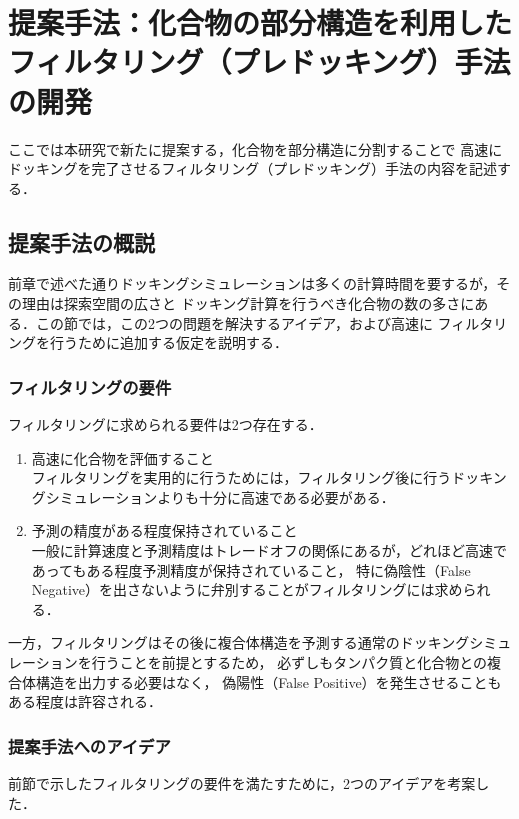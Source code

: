 \chapter{提案手法：化合物の部分構造を利用したフィルタリング（プレドッキング）手法の開発}
ここでは本研究で新たに提案する，化合物を部分構造に分割することで
高速にドッキングを完了させるフィルタリング（プレドッキング）手法の内容を記述する．

\section{提案手法の概説}
前章で述べた通りドッキングシミュレーションは多くの計算時間を要するが，その理由は探索空間の広さと
ドッキング計算を行うべき化合物の数の多さにある．この節では，この2つの問題を解決するアイデア，および高速に
フィルタリングを行うために追加する仮定を説明する．

\subsection{フィルタリングの要件}\label{subsec}
フィルタリングに求められる要件は2つ存在する．
\begin{enumerate}
\item 高速に化合物を評価すること\\
	フィルタリングを実用的に行うためには，フィルタリング後に行うドッキングシミュレーションよりも十分に高速である必要がある．
\item 予測の精度がある程度保持されていること\\
	一般に計算速度と予測精度はトレードオフの関係にあるが，どれほど高速であってもある程度予測精度が保持されていること，
	特に偽陰性（False Negative）を出さないように弁別することがフィルタリングには求められる．
\end{enumerate}
一方，フィルタリングはその後に複合体構造を予測する通常のドッキングシミュレーションを行うことを前提とするため，
必ずしもタンパク質と化合物との複合体構造を出力する必要はなく，
偽陽性（False Positive）を発生させることもある程度は許容される．

\subsection{提案手法へのアイデア}\label{subsec:idea}
前節で示したフィルタリングの要件を満たすために，2つのアイデアを考案した．

